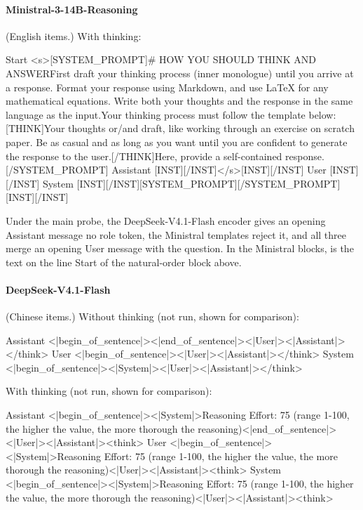 \paragraph{Ministral-3-14B-Reasoning} (English items.)
\noindent With thinking:
\begin{Rendering}
Start      <s>[SYSTEM_PROMPT]# HOW YOU SHOULD THINK AND ANSWER\NL{}\NL{}First draft your thinking process (inner monologue) until you arrive at a response. Format your response using Markdown, and use LaTeX for any mathematical equations. Write both your thoughts and the response in the same language as the input.\NL{}\NL{}Your thinking process must follow the template below:[THINK]Your thoughts or/and draft, like working through an exercise on scratch paper. Be as casual and as long as you want until you are confident to generate the response to the user.[/THINK]Here, provide a self-contained response.[/SYSTEM_PROMPT]
Assistant  [INST][/INST]</s>[INST][/INST]
User       [INST]\NL{}\NL{}\NL{}\NL{}[/INST]
System     [INST][/INST][SYSTEM_PROMPT][/SYSTEM_PROMPT][INST][/INST]
\end{Rendering}

Under the main probe, the DeepSeek-V4.1-Flash encoder gives an opening Assistant message no role token, the Ministral templates reject it, and all three merge an opening User message with the question. In the Ministral blocks,  is the text on the line Start of the natural-order block above.

\paragraph{DeepSeek-V4.1-Flash} (Chinese items.)
\noindent Without thinking (not run, shown for comparison):
\begin{Rendering}
Assistant  <|begin_of_sentence|><|end_of_sentence|><|User|><|Assistant|></think>
User       <|begin_of_sentence|><|User|>\NL{}\NL{}<|Assistant|></think>
System     <|begin_of_sentence|><|System|><|User|><|Assistant|></think>
\end{Rendering}
\noindent With thinking (not run, shown for comparison):
\begin{Rendering}
Assistant  <|begin_of_sentence|><|System|>Reasoning Effort: 75 (range 1-100, the higher the value, the more thorough the reasoning)\NL{}\NL{}<|end_of_sentence|><|User|><|Assistant|><think>
User       <|begin_of_sentence|><|System|>Reasoning Effort: 75 (range 1-100, the higher the value, the more thorough the reasoning)\NL{}\NL{}<|User|>\NL{}\NL{}<|Assistant|><think>
System     <|begin_of_sentence|><|System|>Reasoning Effort: 75 (range 1-100, the higher the value, the more thorough the reasoning)\NL{}\NL{}<|User|><|Assistant|><think>
\end{Rendering}
